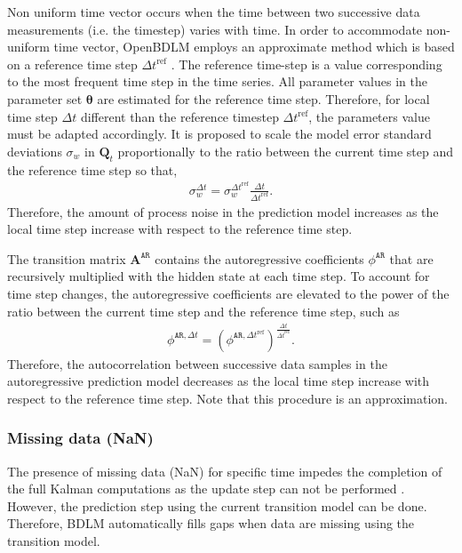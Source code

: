 Non uniform time vector occurs when the time between two successive data measurements (i.e. the timestep) varies with time.
In order to accommodate non-uniform time vector, OpenBDLM employs an approximate method which is based on a reference time step $\Delta t^{\text{ref}} $ \cite{STC:STC2035}. 
The reference time-step is a value corresponding to the most frequent time step in the time series.
All parameter values in the parameter set $\bm \theta$ are estimated for the reference time step. 
Therefore, for local time step $\Delta t$ different than the reference timestep $\Delta t^{\text{ref}} $, the parameters value must be adapted accordingly.
It is proposed to scale the model error standard deviations $\sigma_{w}$ in $\mathbf{Q}_{t}$  proportionally to the ratio between the current time step and the reference time step so that,
\begin{gather*}
\sigma_{w}^{\Delta t}= \sigma_{w}^{\Delta t ^{\text{ref}}}\frac{\Delta t}{\Delta t ^{\text{ref}}}.
\end{gather*}
Therefore, the amount of process noise in the prediction model increases as the local time step increase with respect to the reference time step.

The transition matrix $\mathbf{A}^{\mathtt{AR}}$ contains the autoregressive coefficients $\phi^{\mathtt{AR}}$ that are recursively multiplied with the hidden state at each time step. 
To account for time step changes, the autoregressive coefficients are elevated to the power of the ratio between the current time step and the reference time step, such as
\begin{gather*}
\phi^{\mathtt{AR}, \Delta t}=  (\phi^{\mathtt{AR}, \Delta t ^{\text{ref}}})^{\frac{\Delta t}{\Delta t ^{\text{ref}}}}.
\end{gather*}
Therefore, the autocorrelation between successive data samples in the autoregressive prediction model decreases as the local time step increase with respect to the reference time step.
Note that this procedure is an approximation.
\subsubsection{Missing data (NaN)}

The presence of missing data (NaN) for specific time impedes the completion of the full Kalman computations as the update step can not be performed \cite{STC:STC2035}.
However, the prediction step using the current transition model can be done.
Therefore, BDLM automatically fills gaps when data are missing using the transition model.


